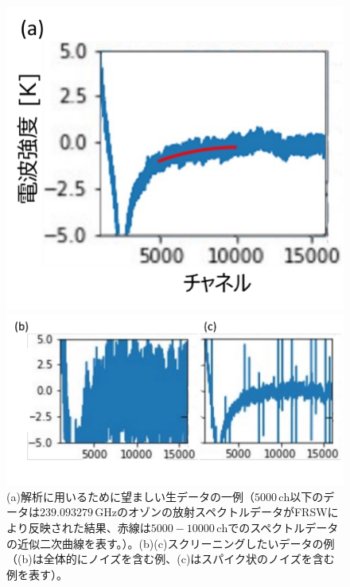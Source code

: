 \begin{figure}[htbp]
    \centering
    \begin{minipage}{0.33\linewidth}
        \centering
        \includegraphics[width=\linewidth]{master_thesis_contents/master_thesis_fig/raw_spectrum_good.pdf}
    \end{minipage}
    \begin{minipage}{0.6\linewidth}
        \centering
        \includegraphics[scale=0.6]{master_thesis_contents/master_thesis_fig/raw_spectrum_bad.pdf}
    \end{minipage}
    \caption{(a)解析に用いるために望ましい生データの一例（$5000\, \mathrm{ch}$以下のデータは$239.093279\, \mathrm{GHz}$のオゾンの放射スペクトルデータがFRSWにより反映された結果、赤線は$5000-10000\, \mathrm{ch}$でのスペクトルデータの近似二次曲線を表す。）。(b)(c)スクリーニングしたいデータの例（(b)は全体的にノイズを含む例、(c)はスパイク状のノイズを含む例を表す）。}
    \label{fig:raw_spectrum}
\end{figure}
